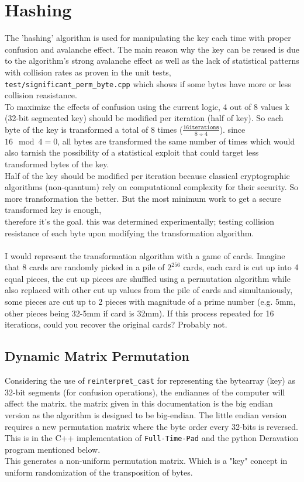 \documentclass[fleqn, a4paper,12pt]{article}
\begin{document}
\section{Hashing}

The 'hashing' algorithm is used for manipulating the key each time with proper confusion and avalanche effect. The main reason why the key can be reused is due to the algorithm's strong avalanche effect as well as the lack of statistical patterns with collision rates as proven in the unit tests, \texttt{test/significant\_perm\_byte.cpp} which shows if some bytes have more or less collision reasistance.
\\
To maximize the effects of confusion using the current logic, 4 out of 8 values k (32-bit segmented key) should be modified per iteration (half of key). So each byte of the key is transformed a total of 8 times ($\frac{16 \texttt{iterations}}{8 \div 4}$). since $16 \mod 4 = 0$, all bytes are transformed the same number of times which would also tarnish the possibility of a statistical exploit that could target less transformed bytes of the key.
\\
Half of the key should be modified per iteration because classical cryptographic algorithms (non-quantum) rely on computational complexity for their security. So more transformation the better. But the most minimum work to get a secure transformed key is enough, \\
therefore it's the goal. this was determined experimentally; testing collision resistance of each byte upon modifying the transformation algorithm. \\
\\

I would represent the transformation algorithm with a game of cards. Imagine that 8 cards are randomly picked in a pile of $2^{256}$ cards, each card is cut up into 4 equal pieces, the cut up pieces are shuffled using a permutation algorithm while also replaced with other cut up values from the pile of cards and simultaniously, some pieces are cut up to 2 pieces with magnitude of a prime number (e.g. 5mm, other pieces being 32-5mm if card is 32mm). If this process repeated for 16 iterations, could you recover the original cards? Probably not.

\subsection{Dynamic Matrix Permutation}

Considering the use of \texttt{reinterpret\_cast} for representing the bytearray (key) as 32-bit segments (for confusion operations), the endiannes of the computer will affect the matrix. the matrix given in this documentation is the big endian version as the algorithm is designed to be big-endian. The little endian version requires a new permutation matrix where the byte order every 32-bits is reversed. This is in the C++ implementation of \texttt{Full-Time-Pad} and the python Deravation program mentioned below.
\\
This generates a non-uniform permutation matrix. Which is a "key" concept in uniform randomization of the transposition of bytes.
\end{document}
